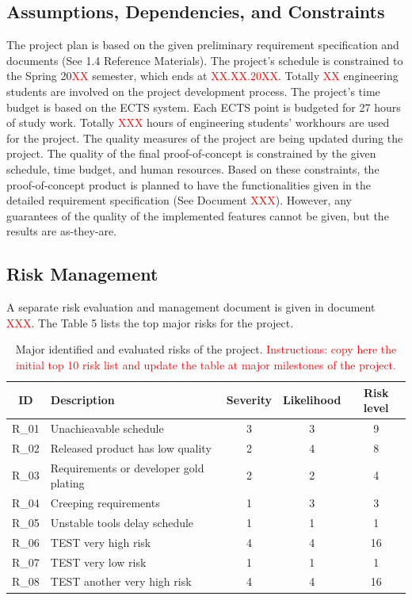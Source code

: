 \documentclass{article}
\begin{document}
\subsection{Assumptions, Dependencies, and Constraints}
The project plan is based on the given preliminary requirement specification and
documents (See 1.4 Reference Materials).
The project’s schedule is constrained to the Spring 20\textcolor{red}{XX} semester, which ends
at \textcolor{red}{XX.XX.20XX}. Totally \textcolor{red}{XX} engineering students are involved on the project
development process.
The project’s time budget is based on the ECTS system. Each ECTS point is
budgeted for 27 hours of study work. Totally \textcolor{red}{XXX} hours of engineering students’
workhours are used for the project.
The quality measures of the project are being updated during the project. The
quality of the final proof-of-concept is constrained by the given schedule, time
budget, and human resources. Based on these constraints, the proof-of-concept
product is planned to have the functionalities given in the detailed requirement
specification (See Document \textcolor{red}{XXX}). However, any guarantees of the quality of the
implemented features cannot be given, but the results are as-they-are.
\subsection{Risk Management}
A separate risk evaluation and management document is given in document \textcolor{red}{XXX}.
The Table 5 lists the top major risks for the project.

\begin{table}[h]
\centering
\caption{Major identified and evaluated risks of the project. \textcolor{red} {Instructions: copy
here the initial top 10 risk list and update the table at major milestones of the
project. }}

\label{tab:project_risks}
\begin{tabular}{|c|l|c|c|c|}
\hline
\textbf{ID} & \textbf{Description} & \textbf{Severity} & \textbf{Likelihood} & \textbf{Risk level} \\
\hline
R\_01 & Unachieavable schedule & 3 & 3 & \cellcolor{yellow} 9 \\
\hline
R\_02 & Released product has low quality & 2 & 4 & \cellcolor{yellow} 8 \\
\hline
R\_03 & Requirements or developer gold plating & 2 & 2 & \cellcolor{lightgreen} 4 \\
\hline
R\_04 & Creeping requirements & 1 & 3 & \cellcolor{lightgreen} 3 \\
\hline
R\_05 & Unstable tools delay schedule & 1 & 1 & \cellcolor{green} 1 \\
\hline
R\_06 & TEST very high risk & 4 & 4 & \cellcolor{red} 16 \\
\hline
R\_07 & TEST very low risk & 1 & 1 & \cellcolor{green}  1 \\
\hline
R\_08 & TEST another very high risk & 4 & 4 & \cellcolor{red} 16 \\
\hline
\end{tabular}
\end{table}
\end{document}
